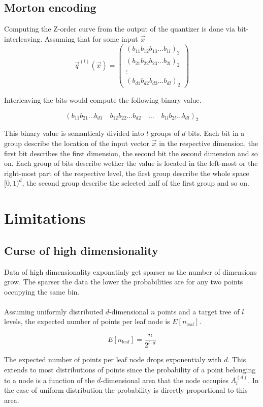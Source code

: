 \documentclass{juliacon}
\begin{document}
\subsection{Morton encoding}
Computing the Z-order curve from the output of the quantizer is done via bit-interleaving.
Assuming that for some input $\vec{x}$
$$
\vec{q}^{(l)}(\vec{x}) =
\begin{pmatrix}
  (b_{11}b_{12}b_{13}\dots b_{1l})_2\\
  (b_{21}b_{22}b_{23}\dots b_{2l})_2\\
  \vdots \\
  (b_{d1}b_{d2}b_{d3}\dots b_{dl})_2
\end{pmatrix}
$$

Interleaving the bits would compute the following binary value.

$$(b_{11}b_{21}\dots b_{d1}\quad b_{12}b_{22}\dots b_{d2}\quad \dots \quad b_{1l}b_{2l}\dots b_{dl})_2$$

This binary value is semanticaly divided into $l$ groups of $d$ bits. Each bit in a group
describe the location of the input vector $\vec{x}$ in the respective dimension, the
first bit describes the first dimension, the second bit the second dimension and so on.
Each group of bits describe wether the value is located in the left-most or the
right-most part of the respective level, the first group describe the whole space
$[0,1)^d$, the second group describe the selected half of the first group and so on.

\section{Limitations}

\subsection{Curse of high dimensionality}
Data of high dimensionality exponatialy get sparser as the number of dimensions grow.
The sparser the data the lower the probabilities are for any two points occupying the same
bin.
\\\\
Assuming uniformly distributed $d$-dimensional $n$ points and a target tree of
$l$ levels, the expected number of points per leaf node is $E[n_\textrm{leaf}]$.

$$E[n_\textrm{leaf}] = \frac{n}{2^{l\cdot d}}$$

The expected number of points per leaf node drops exponentialy with $d$. This extends
to most distributions of points since the probability of a point belonging to a node is a
function of the $d$-dimensional area that the node occupies $A^{(d)}_l $.
In the case of uniform distribution the probability is directly proportional
to this area.
\end{document}
